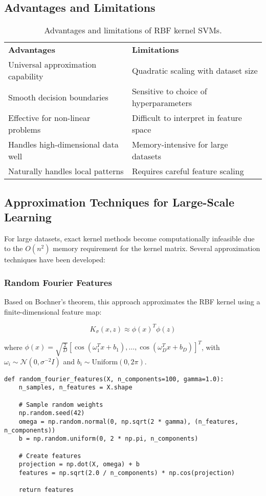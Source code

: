 \documentclass[11pt]{article}
\begin{document}
\subsection{Advantages and Limitations}
\begin{table}[h]
  \centering
  \begin{tabular}{p{}p{}}
    \textbf{Advantages} & \textbf{Limitations} \\
    Universal approximation capability & Quadratic scaling with dataset size \\
    Smooth decision boundaries & Sensitive to choice of hyperparameters \\
    Effective for non-linear problems & Difficult to interpret in feature space \\
    Handles high-dimensional data well & Memory-intensive for large datasets \\
    Naturally handles local patterns & Requires careful feature scaling \\
  \end{tabular}
  \caption{Advantages and limitations of RBF kernel SVMs.}
\end{table}

\subsection{Approximation Techniques for Large-Scale Learning}
For large datasets, exact kernel methods become computationally infeasible due to the $O(n^2)$ memory requirement for the kernel matrix. Several approximation techniques have been developed:

\subsubsection{Random Fourier Features}
Based on Bochner's theorem, this approach approximates the RBF kernel using a finite-dimensional feature map:

\[
K_\sigma(x,z) \approx \phi(x)^T\phi(z)
\]

where $\phi(x) = \sqrt{\frac{2}{D}}[\cos(\omega_1^Tx + b_1), \ldots, \cos(\omega_D^Tx + b_D)]^T$, with $\omega_i \sim \mathcal{N}(0, \sigma^{-2}I)$ and $b_i \sim \text{Uniform}(0, 2\pi)$.

\begin{lstlisting}
def random_fourier_features(X, n_components=100, gamma=1.0):
    n_samples, n_features = X.shape
    
    # Sample random weights
    np.random.seed(42)
    omega = np.random.normal(0, np.sqrt(2 * gamma), (n_features, n_components))
    b = np.random.uniform(0, 2 * np.pi, n_components)
    
    # Create features
    projection = np.dot(X, omega) + b
    features = np.sqrt(2.0 / n_components) * np.cos(projection)
    
    return features
\end{lstlisting}
\end{document}
